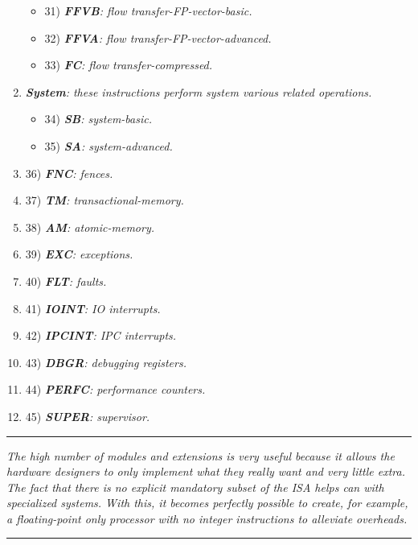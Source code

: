 \begin{enumerate}
\begin{itemize}
                \item 31) \textit{\textbf{FFVB}: flow transfer-FP-vector-basic.}
                \item 32) \textit{\textbf{FFVA}: flow transfer-FP-vector-advanced.}

                \item 33) \textit{\textbf{FC}: flow transfer-compressed.}

            \end{itemize}

        \item \textit{\textbf{System}: these instructions perform system various related operations.}

            \begin{itemize}

                \item 34) \textit{\textbf{SB}: system-basic.}
                \item 35) \textit{\textbf{SA}: system-advanced.}

            \end{itemize}

        \item 36) \textit{\textbf{FNC}: fences.}
        \item 37) \textit{\textbf{TM}: transactional-memory.}
        \item 38) \textit{\textbf{AM}: atomic-memory.}

        \item 39) \textit{\textbf{EXC}: exceptions.}
        \item 40) \textit{\textbf{FLT}: faults.}
        \item 41) \textit{\textbf{IOINT}: IO interrupts.}           
        \item 42) \textit{\textbf{IPCINT}: IPC interrupts.}

        \item 43) \textit{\textbf{DBGR}: debugging registers.}
        \item 44) \textit{\textbf{PERFC}: performance counters.}

        \item 45) \textit{\textbf{SUPER}: supervisor.}

        \end{enumerate}

    \par\noindent\rule{\textwidth}{0.4pt}
    \textit{The high number of modules and extensions is very useful because it allows the hardware designers to only implement what they really want and very little extra. The fact that there is no explicit mandatory subset of the ISA helps can with specialized systems. With this, it becomes perfectly possible to create, for example, a floating-point only processor with no integer instructions to alleviate overheads.}
    \par\noindent\rule{\textwidth}{0.4pt}
